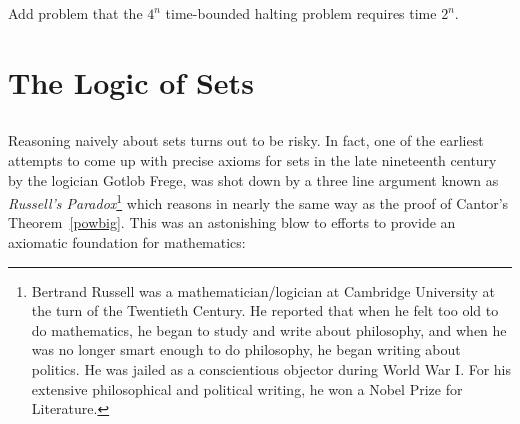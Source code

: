 \begin{problems}

\classproblems
{}

\homeworkproblems
{}

\begin{editingnotes}
Add problem that the $4^n$ time-bounded halting problem requires time
$2^n$.
\end{editingnotes}

\examproblems
{}

\end{problems}

\section{The Logic of Sets}\label{set_logic_sec}%

\subsection{}

Reasoning naively about sets turns out to be risky.  In fact, one of the
earliest attempts to come up with precise axioms for sets in the late
nineteenth century by the logician  Gotlob Frege, was
shot down by a three line argument known as \emph{Russell's
  Paradox}\footnote{Bertrand Russell%
was a mathematician/logician at Cambridge University at the turn of the Twentieth
 Century.  He reported that when he felt too old to do mathematics, he began to study
  and write about philosophy, and when he was no longer smart enough to do
  philosophy, he began writing about politics.  He was jailed as a
  conscientious objector during World War I.  For his extensive
  philosophical and political writing, he won a Nobel Prize for
  Literature.} which reasons in nearly the same way as the proof of
Cantor's Theorem~\ref{powbig}.  This was an astonishing blow to efforts to
provide an axiomatic foundation for mathematics:


